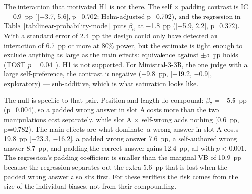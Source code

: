\documentclass[conference]{IEEEtran}
\begin{document}
The interaction that motivated H1 is not there. The self $\times$ padding contrast is IC $=0.9$~pp ([$-$3.7, 5.6], p=0.702; Holm-adjusted p=0.702), and the regression in Table~\ref{tab:linear-probability-model} puts $\beta_6$ at $-$1.8~pp ([$-$5.9, 2.2], p=0.372). With a standard error of 2.4~pp the design could only have detected an interaction of 6.7~pp or more at 80\% power, but the estimate is tight enough to exclude anything as large as the main effects: equivalence against $\pm5$~pp holds (TOST $p=0.041$). H1 is not supported. For Ministral-3-3B, the one judge with a large self-preference, the contrast is negative ($-$9.8~pp, [$-$19.2, $-$0.9], exploratory) --- sub-additive, which is what saturation looks like.

The null is specific to that pair. Position and length do compound: $\beta_7=-5.6$~pp (p=0.004), so a padded wrong answer in slot A costs more than the two manipulations cost separately, while slot A $\times$ self-wrong adds nothing (0.6~pp, p=0.782). The main effects are what dominate: a wrong answer in slot A costs 19.8~pp [$-$23.3, $-$16.2], a padded wrong answer 7.6~pp, a self-authored wrong answer 8.7~pp, and padding the correct answer gains 12.4~pp, all with $p<0.001$. The regression's padding coefficient is smaller than the marginal VB of 10.9~pp because the regression separates out the extra 5.6~pp that is lost when the padded wrong answer also sits first. For these verifiers the risk comes from the size of the individual biases, not from their compounding.
\end{document}
